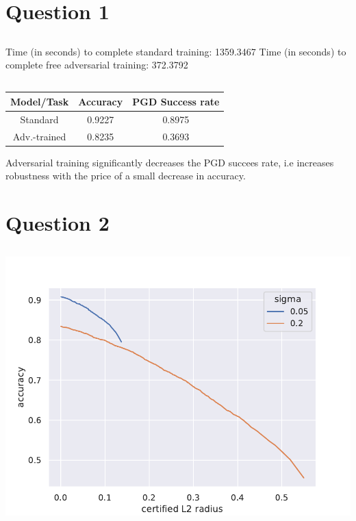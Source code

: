 \documentclass{article}
\begin{document}
\section{Question 1}
\setcounter{subsection}{2}
\subsection{}
Time (in seconds) to complete standard training: 1359.3467
Time (in seconds) to complete free adversarial training: 372.3792
\subsection{}
\begin{center}
\begin{tabular}{||c c c||} 
    \hline
    Model/Task & Accuracy & PGD Success rate \\ [0.5ex] 
    \hline\hline
    Standard & 0.9227 & 0.8975 \\ 
    \hline
    Adv.-trained & 0.8235 & 0.3693 \\
    \hline
\end{tabular}
\end{center}
Adversarial training significantly decreases the PGD succees rate, i.e increases robustness with the price of a small decrease in accuracy.
\section{Question 2}
\setcounter{subsection}{1}
\subsection{}
\includegraphics[scale=0.7]{randomized-smoothing-acc-vs-radius.pdf}
\end{document}
